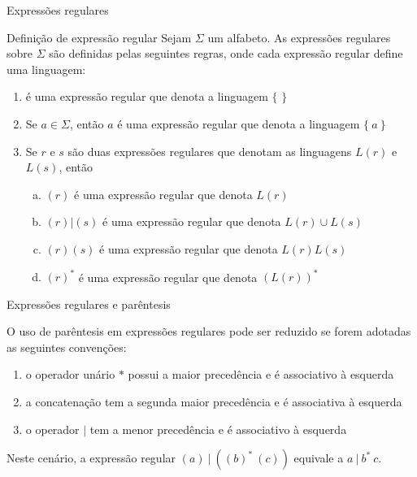 \begin{frame}[fragile]{Expressões regulares}

    \begin{block}{Definição de expressão regular}
        Sejam $\Sigma$ um alfabeto. As expressões regulares sobre $\Sigma$ são definidas pelas seguintes regras, onde cada expressão regular define uma linguagem:
        \begin{enumerate}
            \item {} é uma expressão regular que denota a linguagem $\{$  $\}$
            \item Se $a\in\Sigma$, então $a$ é uma expressão regular que denota a linguagem $\{\ a\ \}$
            \item Se $r$ e $s$ são duas expressões regulares que denotam as linguagens $L(r)$ e  $L(s)$, então
            \begin{enumerate}[(a)]
                \item $(r)$ é uma expressão regular que denota $L(r)$
                \item $(r)|(s)$ é uma expressão regular que denota $L(r)\cup L(s)$
                \item $(r)(s)$ é uma expressão regular que denota $L(r)L(s)$
                \item $(r)^*$ é uma expressão regular que denota $(L(r))^*$
            \end{enumerate}
        \end{enumerate}
    \end{block}

\end{frame}

\begin{frame}[fragile]{Expressões regulares e parêntesis}

    O uso de parêntesis em expressões regulares pode ser reduzido se forem adotadas as seguintes convenções:
    \pause

    \vspace{0.2in}

    \begin{enumerate}
        \item o operador unário $*$ possui a maior precedência e é associativo à esquerda
        \pause

        \item a concatenação tem a segunda maior precedência e é associativa à esquerda
        \pause

        \item o operador $|$ tem a menor precedência e é associativo à esquerda
        \pause
    \end{enumerate}

    \vspace{0.2in}

    Neste cenário, a expressão regular $(a)\ |\ ((b)^*\ (c))$ equivale a $a\ |\ b^*\ c$.

\end{frame}

